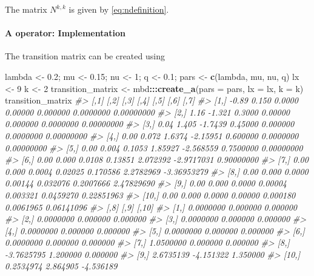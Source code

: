 \documentclass[]{article}
\newenvironment{Shaded}{\begin{snugshade}}{\end{snugshade}}
\newcommand{\CommentTok}[1]{\textcolor[rgb]{0.56,0.35,0.01}{\textit{#1}}}
\newcommand{\DataTypeTok}[1]{\textcolor[rgb]{0.13,0.29,0.53}{#1}}
\newcommand{\DecValTok}[1]{\textcolor[rgb]{0.00,0.00,0.81}{#1}}
\newcommand{\FloatTok}[1]{\textcolor[rgb]{0.00,0.00,0.81}{#1}}
\newcommand{\KeywordTok}[1]{\textcolor[rgb]{0.13,0.29,0.53}{\textbf{#1}}}
\newcommand{\NormalTok}[1]{#1}
\newcommand{\OperatorTok}[1]{\textcolor[rgb]{0.81,0.36,0.00}{\textbf{#1}}}
\newcommand{\StringTok}[1]{\textcolor[rgb]{0.31,0.60,0.02}{#1}}
\let\oldparagraph\paragraph
\renewcommand{\paragraph}[1]{\oldparagraph{#1}\mbox{}}
\begin{document}
The matrix \(N^{k,k}\) is given by \eqref{eq:ndefinition}.

\hypertarget{a-operator-implementation}{%
\paragraph{A operator: Implementation}\label{a-operator-implementation}}

The transition matrix can be created using

\begin{Shaded}
\begin{Highlighting}[]
\NormalTok{lambda <-}\StringTok{ }\FloatTok{0.2}\NormalTok{; mu <-}\StringTok{ }\FloatTok{0.15}\NormalTok{; nu <-}\StringTok{ }\DecValTok{1}\NormalTok{; q <-}\StringTok{ }\FloatTok{0.1}\NormalTok{;}
\NormalTok{pars <-}\StringTok{ }\KeywordTok{c}\NormalTok{(lambda, mu, nu, q)}
\NormalTok{lx <-}\StringTok{ }\DecValTok{9}
\NormalTok{k <-}\StringTok{ }\DecValTok{2}
\NormalTok{transition_matrix <-}\StringTok{ }\NormalTok{mbd}\OperatorTok{:::}\KeywordTok{create_a}\NormalTok{(}\DataTypeTok{pars =}\NormalTok{ pars, }\DataTypeTok{lx =}\NormalTok{ lx, }\DataTypeTok{k =}\NormalTok{ k)}
\NormalTok{transition_matrix}
\CommentTok{#>        [,1]   [,2]    [,3]     [,4]      [,5]       [,6]        [,7]}
\CommentTok{#>  [1,] -0.89  0.150  0.0000  0.00000  0.000000  0.0000000  0.00000000}
\CommentTok{#>  [2,]  1.16 -1.321  0.3000  0.00000  0.000000  0.0000000  0.00000000}
\CommentTok{#>  [3,]  0.04  1.405 -1.7439  0.45000  0.000000  0.0000000  0.00000000}
\CommentTok{#>  [4,]  0.00  0.072  1.6374 -2.15951  0.600000  0.0000000  0.00000000}
\CommentTok{#>  [5,]  0.00  0.004  0.1053  1.85927 -2.568559  0.7500000  0.00000000}
\CommentTok{#>  [6,]  0.00  0.000  0.0108  0.13851  2.072392 -2.9717031  0.90000000}
\CommentTok{#>  [7,]  0.00  0.000  0.0004  0.02025  0.170586  2.2782969 -3.36953279}
\CommentTok{#>  [8,]  0.00  0.000  0.0000  0.00144  0.032076  0.2007666  2.47829690}
\CommentTok{#>  [9,]  0.00  0.000  0.0000  0.00004  0.003321  0.0459270  0.22851963}
\CommentTok{#> [10,]  0.00  0.000  0.0000  0.00000  0.000180  0.0061965  0.06141096}
\CommentTok{#>             [,8]      [,9]     [,10]}
\CommentTok{#>  [1,]  0.0000000  0.000000  0.000000}
\CommentTok{#>  [2,]  0.0000000  0.000000  0.000000}
\CommentTok{#>  [3,]  0.0000000  0.000000  0.000000}
\CommentTok{#>  [4,]  0.0000000  0.000000  0.000000}
\CommentTok{#>  [5,]  0.0000000  0.000000  0.000000}
\CommentTok{#>  [6,]  0.0000000  0.000000  0.000000}
\CommentTok{#>  [7,]  1.0500000  0.000000  0.000000}
\CommentTok{#>  [8,] -3.7625795  1.200000  0.000000}
\CommentTok{#>  [9,]  2.6735139 -4.151322  1.350000}
\CommentTok{#> [10,]  0.2534974  2.864905 -4.536189}
\end{Highlighting}
\end{Shaded}
\end{document}
